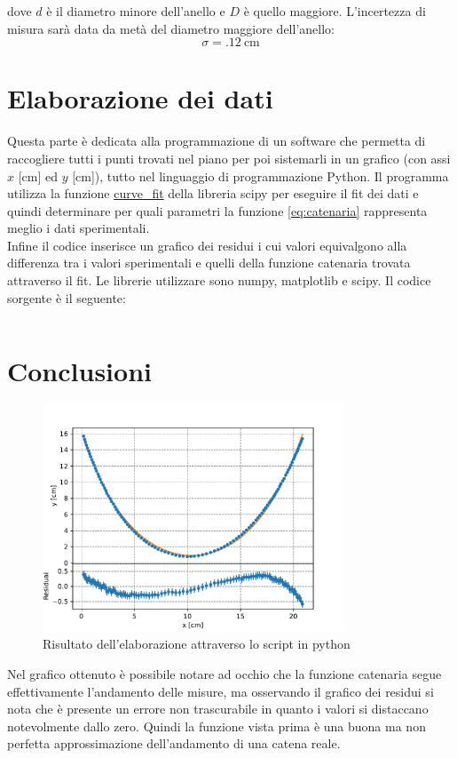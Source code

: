 \documentclass{article}
\begin{document}
dove $d$ è il diametro minore dell'anello e $D$ è quello maggiore.
L'incertezza di misura sarà data da metà del diametro maggiore dell'anello:
\begin{equation*}
    \sigma = \SI{.12}{\cm}
\end{equation*}

\section{Elaborazione dei dati}
Questa parte è dedicata alla programmazione di un software che permetta
di raccogliere tutti i punti trovati nel piano per poi sistemarli in un grafico
(con assi $x$ [cm] ed $y$ [cm]), tutto nel linguaggio di programmazione Python.
Il programma utilizza la funzione \href{https://docs.scipy.org/doc/scipy/reference/generated/scipy.optimize.curve_fit.html}{curve\_fit}
della libreria scipy per eseguire il fit dei dati e quindi determinare per quali
parametri la funzione \ref{eq:catenaria} rappresenta meglio i dati sperimentali.\\
Infine il codice inserisce un grafico dei residui i cui valori equivalgono alla differenza
tra i valori sperimentali e quelli della funzione catenaria trovata attraverso il fit.
Le librerie utilizzare sono numpy, matplotlib e scipy. Il codice sorgente è il seguente:
\inputminted[linenos, frame=single]{python}{extra/catenaria.py}

\section{Conclusioni}
\begin{figure}[ht]
    \centering
    \includegraphics[width=0.8\textwidth]{extra/catenaria.pdf}
    \caption{Risultato dell'elaborazione attraverso lo script in python}
    \label{fig:extra-catenaria-pdf}
\end{figure}
Nel grafico ottenuto è possibile notare ad occhio che la funzione catenaria segue effettivamente
l'andamento delle misure, ma osservando il grafico dei residui si nota
che è presente un errore non trascurabile in quanto i valori si distaccano notevolmente dallo zero.
Quindi la funzione vista prima è una buona ma non perfetta approssimazione dell'andamento
di una catena reale.
\end{document}
